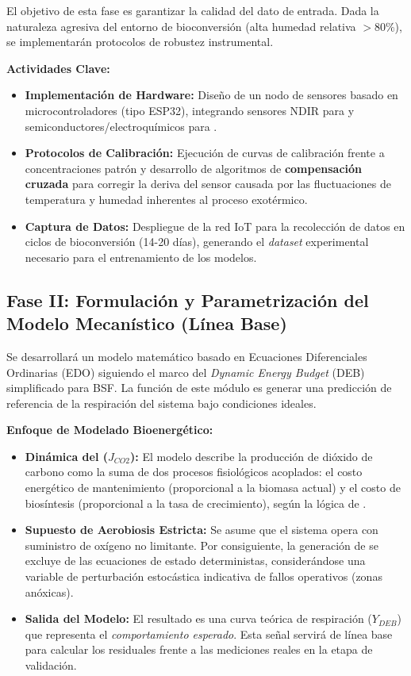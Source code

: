 El objetivo de esta fase es garantizar la calidad del dato de entrada. Dada la naturaleza agresiva del entorno de bioconversión (alta humedad relativa $>80\%$), se implementarán protocolos de robustez instrumental.

\textbf{Actividades Clave:}
\begin{itemize}
    \item \textbf{Implementación de Hardware:} Diseño de un nodo de sensores basado en microcontroladores (tipo ESP32), integrando sensores NDIR para  y semiconductores/electroquímicos para .
    \item \textbf{Protocolos de Calibración:} Ejecución de curvas de calibración frente a concentraciones patrón y desarrollo de algoritmos de \textbf{compensación cruzada} para corregir la deriva del sensor causada por las fluctuaciones de temperatura y humedad inherentes al proceso exotérmico.
    \item \textbf{Captura de Datos:} Despliegue de la red IoT para la recolección de datos en ciclos de bioconversión (14-20 días), generando el \textit{dataset} experimental necesario para el entrenamiento de los modelos.
\end{itemize}

\subsection{Fase II: Formulación y Parametrización del Modelo Mecanístico (Línea Base)}

Se desarrollará un modelo matemático basado en Ecuaciones Diferenciales Ordinarias (EDO) siguiendo el marco del \textit{Dynamic Energy Budget} (DEB) simplificado para BSF. La función de este módulo es generar una predicción de referencia de la respiración del sistema bajo condiciones ideales.

\textbf{Enfoque de Modelado Bioenergético:}
\begin{itemize}
    \item \textbf{Dinámica del  ($J_{CO2}$):} El modelo describe la producción de dióxido de carbono como la suma de dos procesos fisiológicos acoplados: el costo energético de mantenimiento (proporcional a la biomasa actual) y el costo de biosíntesis (proporcional a la tasa de crecimiento), según la lógica de \textcite{eriksenDynamicModellingFeed2022}.
    \item \textbf{Supuesto de Aerobiosis Estricta:} Se asume que el sistema opera con suministro de oxígeno no limitante. Por consiguiente, la generación de  se excluye de las ecuaciones de estado deterministas, considerándose una variable de perturbación estocástica indicativa de fallos operativos (zonas anóxicas).
    \item \textbf{Salida del Modelo:} El resultado es una curva teórica de respiración ($Y_{DEB}$) que representa el \textit{comportamiento esperado}. Esta señal servirá de línea base para calcular los residuales frente a las mediciones reales en la etapa de validación.\end{itemize}

